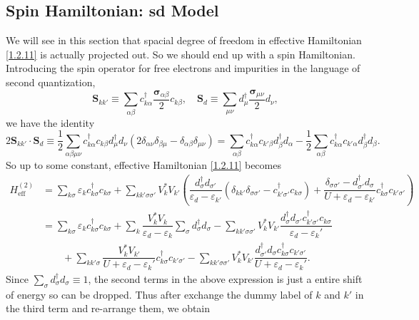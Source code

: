 \documentclass[aps,prx,superscriptaddress,onecolumn,preprintnumbers,nofootinbib,longbibliography]{revtex4-1}
\begin{document}
	\subsection{Spin Hamiltonian: sd Model}
		We will see in this section that spacial degree of freedom in effective Hamiltonian \eqref{1.2.11} is actually projected out. So we should end up with a spin Hamiltonian. Introducing the spin operator for free electrons and impurities in the language of second quantization,
		\begin{equation*}
			\bm{S}_{kk'}\equiv\sum_{\alpha \beta}c_{k \alpha}^\dagger\dfrac{\bm{\sigma}_{\alpha \beta}}{2}c_{k \beta},\quad\bm{S}_d\equiv\sum_{\mu\nu}d_\mu^\dagger\dfrac{\bm{\sigma}_{\mu\nu}}{2}d_{\nu},
		\end{equation*}
		we have the identity
		\begin{equation}
			2\bm{S}_{kk'}\cdot\bm{S}_d\equiv\dfrac{1}{2}\sum_{\alpha\beta\mu\nu}c_{k \alpha}^\dagger c_{k \beta}d_{\mu}^\dagger d_{\nu}(2\delta_{\alpha\nu}\delta_{\beta\mu}-\delta_{\alpha\beta}\delta_{\mu\nu})=\sum_{\alpha\beta}c_{k \alpha}^\dagger c_{k'\beta}d_{\beta}^\dagger d_{\alpha}-\dfrac{1}{2}\sum_{\alpha \beta}c_{k \alpha}^\dagger c_{k' \alpha}d_{\beta}^\dagger d_{\beta}.\label{1.3.1}
		\end{equation}
		So up to some constant, effective Hamiltonian \eqref{1.2.11} becomes
		\begin{align*}
			H_{\text{eff}}^{(2)}&=\sum_{k \sigma}\varepsilon_k c_{k \sigma}^\dagger c_{k \sigma}+\sum_{kk' \sigma\sigma'}V_k^*V_{k'}\left(\dfrac{d_\sigma^\dagger d_{\sigma'}}{\varepsilon_d- \varepsilon_{k'}}(\delta_{kk'}\delta_{\sigma\sigma'}-c_{k'\sigma'}^\dagger c_{k \sigma})+\dfrac{\delta_{\sigma\sigma'}-d_{\sigma'}^\dagger d_\sigma}{U+\varepsilon_d- \varepsilon_{k'}}c_{k \sigma}^\dagger c_{k'\sigma'}\right)\nonumber\\
			&=\sum_{k \sigma}\varepsilon_k c_{k \sigma}^\dagger c_{k \sigma}+\sum_k\dfrac{ V_k^*V_{k}}{\varepsilon_d- \varepsilon_k}\sum_\sigma d_\sigma^\dagger d_\sigma-\sum_{kk'\sigma\sigma'}V_k^*V_{k'}\dfrac{d_\sigma^\dagger d_{\sigma'}c_{k'\sigma'}^\dagger c_{k \sigma}}{\varepsilon_d- \varepsilon_k'}\\
			&\qquad+\sum_{kk'\sigma}\dfrac{V_k^*V_{k'}}{U+\varepsilon_d- \varepsilon_k'}c_{k\sigma}^\dagger c_{k'\sigma'}-\sum_{kk'\sigma\sigma'}V_k^*V_{k'}\dfrac{d_{\sigma'}^\dagger d_\sigma c_{k \sigma}^\dagger c_{k'\sigma'}}{U+\varepsilon_d- \varepsilon_k'}.
		\end{align*}
		Since $\sum_\sigma d_{\sigma}^\dagger d_{\sigma}\equiv1$, the second terms in the above expression is just a entire shift of energy so can be dropped. Thus after exchange the dummy label of $k$ and $k'$ in the third term and re-arrange them, we obtain
\end{document}
